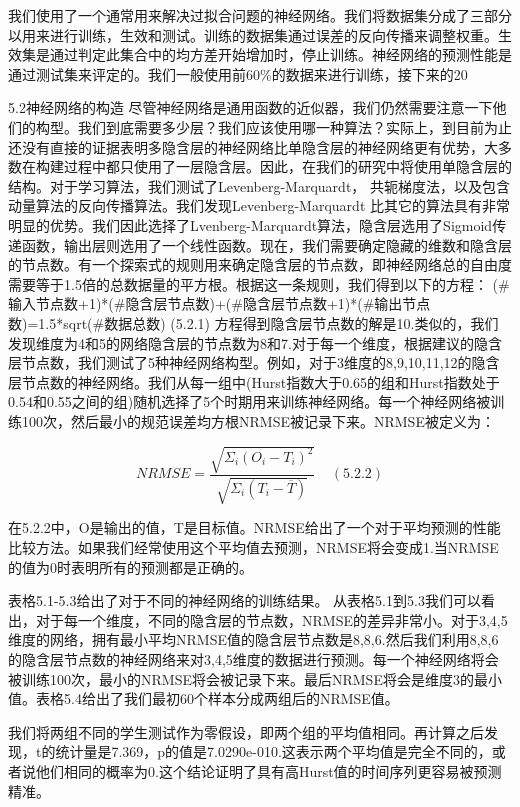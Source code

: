\documentclass[12pt]{article}
\begin{document}
我们使用了一个通常用来解决过拟合问题的神经网络。我们将数据集分成了三部分以用来进行训练，生效和测试。训练的数据集通过误差的反向传播来调整权重。生效集是通过判定此集合中的均方差开始增加时，停止训练。神经网络的预测性能是通过测试集来评定的。我们一般使用前60\%的数据来进行训练，接下来的20%

5.2神经网络的构造
尽管神经网络是通用函数的近似器，我们仍然需要注意一下他们的构型。我们到底需要多少层？我们应该使用哪一种算法？实际上，到目前为止还没有直接的证据表明多隐含层的神经网络比单隐含层的神经网络更有优势，大多数在构建过程中都只使用了一层隐含层。因此，在我们的研究中将使用单隐含层的结构。对于学习算法，我们测试了Levenberg-Marquardt， 共轭梯度法，以及包含动量算法的反向传播算法。我们发现Levenberg-Marquardt 比其它的算法具有非常明显的优势。我们因此选择了Lvenberg-Marquardt算法，隐含层选用了Sigmoid传递函数，输出层则选用了一个线性函数。现在，我们需要确定隐藏的维数和隐含层的节点数。有一个探索式的规则用来确定隐含层的节点数，即神经网络总的自由度需要等于1.5倍的总数据量的平方根。根据这一条规则，我们得到以下的方程：
(#输入节点数+1)*(#隐含层节点数)+(#隐含层节点数+1)*(#输出节点数)=1.5*sqrt(#数据总数)         (5.2.1)
方程得到隐含层节点数的解是10.类似的，我们发现维度为4和5的网络隐含层的节点数为8和7.对于每一个维度，根据建议的隐含层节点数，我们测试了5种神经网络构型。例如，对于3维度的8,9,10,11,12的隐含层节点数的神经网络。我们从每一组中(Hurst指数大于0.65的组和Hurst指数处于0.54和0.55之间的组)随机选择了5个时期用来训练神经网络。每一个神经网络被训练100次，然后最小的规范误差均方根NRMSE被记录下来。NRMSE被定义为：

$$NRMSE=\frac{\sqrt{\Sigma_i(O_i-T_i)^2}}{\sqrt{\Sigma_i(T_i-\overline{T})}}     ~~~~~ (5.2.2)$$

在5.2.2中，O是输出的值，T是目标值。NRMSE给出了一个对于平均预测的性能比较方法。如果我们经常使用这个平均值去预测，NRMSE将会变成1.当NRMSE的值为0时表明所有的预测都是正确的。

表格5.1-5.3给出了对于不同的神经网络的训练结果。
从表格5.1到5.3我们可以看出，对于每一个维度，不同的隐含层的节点数，NRMSE的差异非常小。对于3,4,5维度的网络，拥有最小平均NRMSE值的隐含层节点数是8,8,6.然后我们利用8,8,6的隐含层节点数的神经网络来对3,4,5维度的数据进行预测。每一个神经网络将会被训练100次，最小的NRMSE将会被记录下来。最后NRMSE将会是维度3的最小值。表格5.4给出了我们最初60个样本分成两组后的NRMSE值。

我们将两组不同的学生测试作为零假设，即两个组的平均值相同。再计算之后发现，t的统计量是7.369，p的值是7.0290e-010.这表示两个平均值是完全不同的，或者说他们相同的概率为0.这个结论证明了具有高Hurst值的时间序列更容易被预测精准。
\end{document}
